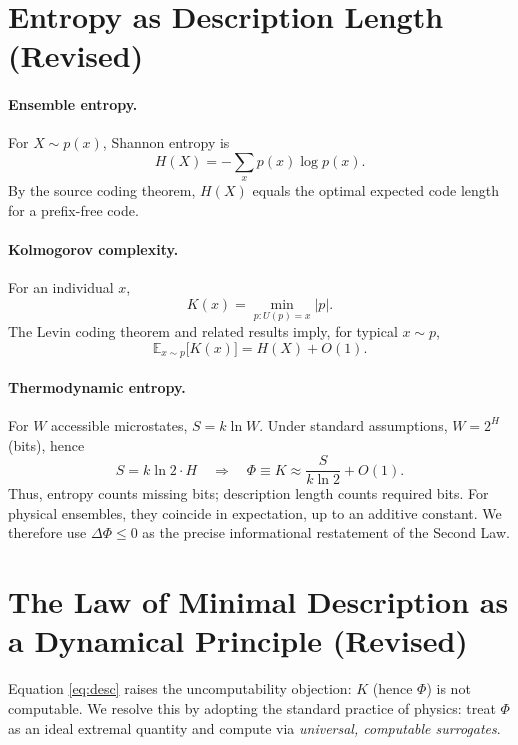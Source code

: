 \documentclass[aps,preprint,onecolumn,longbibliography,nofootinbib]{revtex4-2}
\numberwithin{equation}{section}        %
\begin{document}
\section{Entropy as Description Length (Revised)}\label{sec:entropy}
\paragraph*{Ensemble entropy.}
For $X\sim p(x)$, Shannon entropy is
\begin{equation}
H(X) = -\sum_x p(x)\log p(x). \label{eq:shannon}
\end{equation}
By the source coding theorem, $H(X)$ equals the optimal expected code length for a prefix-free code.

\paragraph*{Kolmogorov complexity.}
For an individual $x$,
\begin{equation}
K(x) = \min_{p:U(p)=x} |p|. \label{eq:kolmogorov}
\end{equation}
The Levin coding theorem and related results imply, for typical $x\sim p$,
\begin{equation}
\mathbb{E}_{x\sim p}\big[K(x)\big] = H(X) + O(1). \label{eq:levinbridge}
\end{equation}

\paragraph*{Thermodynamic entropy.}
For $W$ accessible microstates, $S = k \ln W$. Under standard assumptions, $W = 2^{H}$ (bits), hence
\begin{equation}
S = k\ln 2 \cdot H \quad \Rightarrow \quad \Phi \equiv K \approx \frac{S}{k\ln 2} + O(1). \label{eq:bridge}
\end{equation}
Thus, entropy counts missing bits; description length counts required bits. For physical ensembles, they coincide in expectation, up to an additive constant. We therefore use $\Delta\Phi\le 0$ as the precise informational restatement of the Second Law.

\section{The Law of Minimal Description as a Dynamical Principle (Revised)}\label{sec:dyn}
Equation \eqref{eq:desc} raises the uncomputability objection: $K$ (hence $\Phi$) is not computable. We resolve this by adopting the standard practice of physics: treat $\Phi$ as an ideal extremal quantity and compute via \emph{universal, computable surrogates}.
\end{document}

